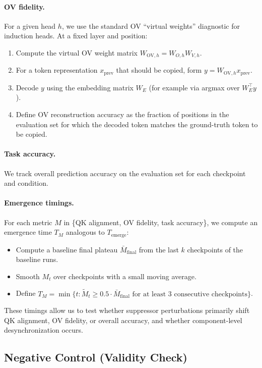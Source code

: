 \documentclass[11pt]{article}
\begin{document}
\paragraph{OV fidelity.}
For a given head $h$, we use the standard OV ``virtual weights'' diagnostic for induction heads. At a fixed layer and position:
\begin{enumerate}
  \item Compute the virtual OV weight matrix $W_{\text{OV},h} = W_{O,h} W_{V,h}$.
  \item For a token representation $x_{\text{prev}}$ that should be copied, form $y = W_{\text{OV},h} x_{\text{prev}}$.
  \item Decode $y$ using the embedding matrix $W_E$ (for example via argmax over $W_E^\top y$).
  \item Define OV reconstruction accuracy as the fraction of positions in the evaluation set for which the decoded token matches the ground-truth token to be copied.
\end{enumerate}

\paragraph{Task accuracy.}
We track overall prediction accuracy on the evaluation set for each checkpoint and condition.

\paragraph{Emergence timings.}
For each metric $M$ in \{QK alignment, OV fidelity, task accuracy\}, we compute an emergence time $T_M$ analogous to $T_{\text{emerge}}$:
\begin{itemize}
  \item Compute a baseline final plateau $\bar{M}_{\text{final}}$ from the last $k$ checkpoints of the baseline runs.
  \item Smooth $M_t$ over checkpoints with a small moving average.
  \item Define $T_M = \min \{ t : \tilde{M}_t \ge 0.5 \cdot \bar{M}_{\text{final}} \text{ for at least 3 consecutive checkpoints} \}$.
\end{itemize}

These timings allow us to test whether suppressor perturbations primarily shift QK alignment, OV fidelity, or overall accuracy, and whether component-level desynchronization occurs.

\subsection{Negative Control (Validity Check)}
\end{document}
